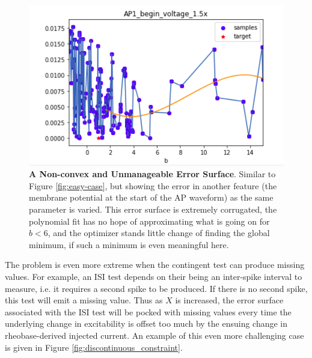 \begin{figure}
\centering
      \includegraphics[scale=0.85]{figures/parameter_b_hopeless_surface.png}
      \caption[A Non-convex and Unmanageable Error Surface (1)]{\textbf{A Non-convex and Unmanageable Error Surface}.
      Similar to Figure \ref{fig:easy-case}, but showing the error in another feature (the membrane potential at the start of the AP waveform) as the same parameter is varied.
      This error surface is extremely corrugated, the polynomial fit has no hope of approximating what is going on for $b<6$, and the optimizer stands little change of finding the global minimum, if such a minimum is even meaningful here.
    }
      \label{fig:probably_smooth_constraint}
\end{figure}

The problem is even more extreme when the contingent test can produce missing values.
For example, an ISI test depends on their being an inter-spike interval to measure, i.e. it requires a second spike to be produced.
If there is no second spike, this test will emit a missing value.
Thus as $X$ is increased, the error surface associated with the ISI test will be pocked with missing values every time the underlying change in excitability is offset too much by the ensuing change in rheobase-derived injected current.
An example of this even more challenging case is given in Figure \ref{fig:discontinuous_constraint}.

